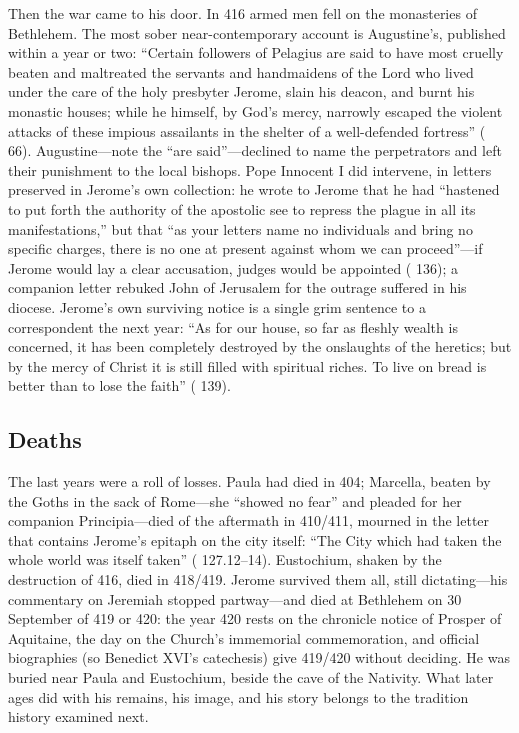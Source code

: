 Then the war came to his door. In 416 armed men fell on the monasteries of
Bethlehem. The most sober near-contemporary account is Augustine's, published
within a year or two: ``Certain followers of Pelagius are said to have most
cruelly beaten and maltreated the servants and handmaidens of the Lord who
lived under the care of the holy presbyter Jerome, slain his deacon, and
burnt his monastic houses; while he himself, by God's mercy, narrowly escaped
the violent attacks of these impious assailants in the shelter of a
well-defended fortress'' ( 66).
Augustine---note the ``are said''---declined to name the perpetrators and
left their punishment to the local bishops. Pope Innocent I did intervene, in
letters preserved in Jerome's own collection: he wrote to Jerome that he had
``hastened to put forth the authority of the apostolic see to repress the
plague in all its manifestations,'' but that ``as your letters name no
individuals and bring no specific charges, there is no one at present against
whom we can proceed''---if Jerome would lay a clear accusation, judges would
be appointed ( 136); a companion letter rebuked John of
Jerusalem for the outrage suffered in his diocese. Jerome's own surviving
notice is a single grim sentence to a correspondent the next year: ``As for
our house, so far as fleshly wealth is concerned, it has been completely
destroyed by the onslaughts of the heretics; but by the mercy of Christ it is
still filled with spiritual riches. To live on bread is better than to lose
the faith'' ( 139).


\subsection{Deaths}

The last years were a roll of losses. Paula had died in 404; Marcella,
beaten by the Goths in the sack of Rome---she ``showed no fear'' and pleaded
for her companion Principia---died of the aftermath in 410/411, mourned in
the letter that contains Jerome's epitaph on the city itself: ``The City
which had taken the whole world was itself taken'' ( 127.12--14).
Eustochium, shaken by the destruction of 416, died in 418/419. Jerome
survived them all, still dictating---his commentary on Jeremiah stopped
partway---and died at Bethlehem on 30 September of 419 or 420: the year 420
rests on the chronicle notice of Prosper of Aquitaine, the day on the
Church's immemorial commemoration, and official biographies (so Benedict
XVI's catechesis) give 419/420 without deciding. He was buried near Paula and
Eustochium, beside the cave of the Nativity. What later ages did with his
remains, his image, and his story belongs to the tradition history examined
next.
